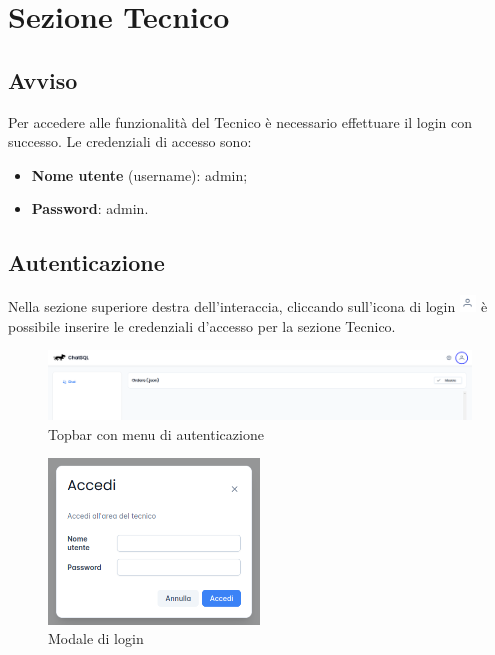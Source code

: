 \section{Sezione Tecnico}
\label{sec:sezTecnico}

\subsection*{Avviso}
Per accedere alle funzionalità del Tecnico è necessario effettuare il login con successo. Le credenziali di accesso sono:
\begin{itemize}
    \item \textbf{Nome utente} (username): admin;
    \item \textbf{Password}: admin. 
\end{itemize}

\subsection{Autenticazione}
Nella sezione superiore destra dell'interaccia, cliccando sull'icona di login \includegraphics[height=1.2em]{assets/user_icon.png} è possibile inserire le credenziali d'accesso per la sezione Tecnico.
\begin{figure}[H]
  \centering
  \includegraphics[width=1\textwidth]{assets/login_topbar.png}
  \caption{Topbar con menu di autenticazione}
\end{figure}
\begin{figure}[H]
  \centering
  \includegraphics[width=0.50\textwidth]{assets/login_modal.png}
  \caption{Modale di login}
\end{figure}


